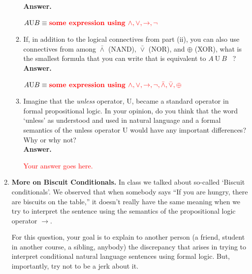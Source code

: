\documentclass[12pt]{article}
\newcommand{\todo}[1]{\textcolor{red}{#1}}
\newenvironment{problem}[2][Problem]{\begin{trivlist}
\item[\hskip \labelsep {\bfseries #1}\hskip \labelsep {\bfseries #2.}]}{\end{trivlist}}
\begin{document}
\begin{problem}{1}
\begin{enumerate}[label=\Alph*.]
\begin{enumerate}[label=\roman*.]
\textbf{Answer.} 

$A \mathrm{U} B \equiv \todo{\textbf{some expression using $\land, \lor, \rightarrow,\neg$}}$

\newpage 

\item If, in addition to the logical connectives from part (ii), you can also use connectives from among $\bar\land$ (NAND), $\bar\lor$ (NOR), and $\oplus$ (XOR), what is the smallest formula that you can write that is equivalent to $A \ \mathrm{U} \ B$ \ ? \\

\textbf{Answer.} 

$A \mathrm{U} B \equiv \todo{\textbf{some expression using $\land, \lor, \rightarrow,\neg,\bar\land,\bar\lor,\oplus$}}$


\item Imagine that the \textit{unless} operator, $\mathrm{U}$, became a standard operator in formal propositional logic. In your opinion, do you think that the word `unless' as understood and used in natural language and a formal semantics of the unless operator $\mathrm{U}$ would have any important differences? Why or why not? \\

\textbf{Answer.} 

\todo{Your answer goes here.}

\end{enumerate}


\newpage
\item \textbf{More on Biscuit Conditionals.} In class we talked about so-called `Biscuit conditionals'. We observed that when somebody says ``If you are hungry, there are biscuits on the table,'' it doesn't really have the same meaning when we try to interpret the sentence using the semantics of the propositional logic operator $\rightarrow$.

For this question, your goal is to explain to another person (a friend, student in another course, a sibling, anybody) the discrepancy that arises in trying to interpret conditional natural language sentences using formal logic. But, importantly, try not to be a jerk about it.


\end{enumerate}
\end{problem}
\end{document}
